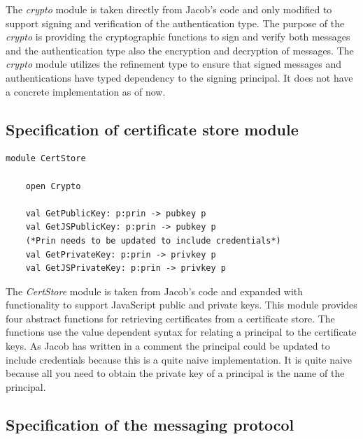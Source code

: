 \documentclass[twosided]{report}
\begin{document}
The \emph{crypto} module is taken directly from Jacob's code and only modified to support signing and verification of the authentication type. The purpose of the \emph{crypto} is providing the cryptographic functions to sign and verify both messages and the authentication type also the encryption and decryption of messages. The \emph{crypto} module utilizes the refinement type to ensure that signed messages and authentications have typed dependency to the signing principal. It does not have a concrete implementation as of now.
\subsection{Specification of certificate store module}

\begin{lstlisting}[style=fstar, caption={Abstract certificate store}]
	module CertStore
	
	open Crypto

	val GetPublicKey: p:prin -> pubkey p
	val GetJSPublicKey: p:prin -> pubkey p
	(*Prin needs to be updated to include credentials*)
	val GetPrivateKey: p:prin -> privkey p 
	val GetJSPrivateKey: p:prin -> privkey p
\end{lstlisting}

The \emph{CertStore} module is taken from Jacob's code and expanded with functionality to support JavaScript public and private keys. This module provides four abstract functions for retrieving certificates from a certificate store. The functions use the value dependent syntax for relating a principal to the certificate keys. As Jacob has written in a comment the principal could be updated to include credentials  because this is a quite naive implementation. It is quite naive because all you need to obtain the private key of a principal is the name of the principal.
\subsection{Specification of the messaging protocol}
\end{document}
